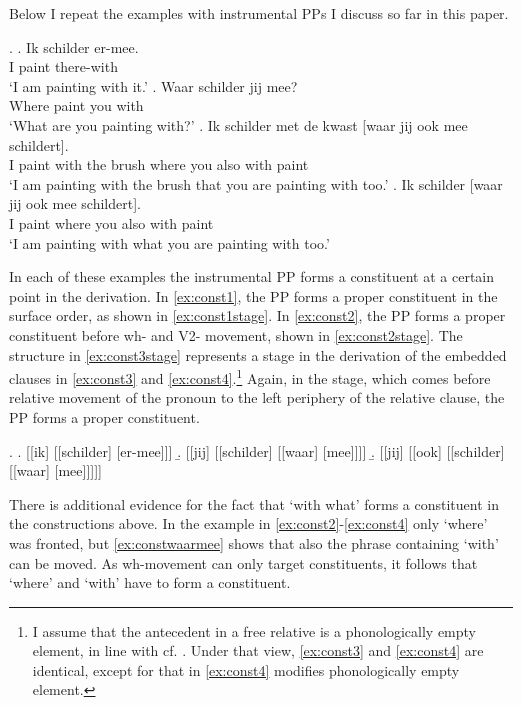 \documentclass{article}
\begin{document}
Below I repeat the examples with instrumental PPs I discuss so far in this paper.

\ex.
\ag. Ik schilder er-mee.\\
 I paint there-with\\
 `I am painting with it.'\label{ex:const1}
\bg. Waar schilder jij mee?\\
 Where paint you with\\
 `What are you painting with?'\label{ex:const2}
\bg. Ik schilder met de kwast [waar jij ook mee schildert].\\
 I paint with the brush where you also with paint\\
 `I am painting with the brush that you are painting with too.'\label{ex:const3}
\bg. Ik schilder [waar jij ook mee schildert].\\
 I paint where you also with paint\\
 `I am painting with what you are painting with too.'\label{ex:const4}

In each of these examples the instrumental PP forms a constituent at a certain point in the derivation. In \ref{ex:const1}, the PP forms a proper constituent in the surface order, as shown in \ref{ex:const1stage}. In \ref{ex:const2}, the PP forms a proper constituent before wh- and V2- movement, shown in \ref{ex:const2stage}.
The structure in \ref{ex:const3stage} represents a stage in the derivation of the embedded clauses in \ref{ex:const3} and \ref{ex:const4}.\footnote{I assume that the antecedent in a free relative is a phonologically empty element, in line with cf. \cite{bresnan1978a,groos1981,himmelreich2017}. Under that view, \ref{ex:const3} and \ref{ex:const4} are identical, except for that in \ref{ex:const4} modifies phonologically empty element.}
Again, in the stage, which comes before relative movement of the pronoun to the left periphery of the relative clause, the PP forms a proper constituent.

\ex.
\a. [[ik] [[schilder] [er-mee]]]\label{ex:const1stage}
\b. [[jij] [[schilder] [[waar] [mee]]]]\label{ex:const2stage}
\b. [[jij] [[ook] [[schilder] [[waar] [mee]]]]]\label{ex:const3stage}

There is additional evidence for the fact that  `with what' forms a constituent in the constructions above. In the example in \ref{ex:const2}-\ref{ex:const4} only  `where' was fronted, but \ref{ex:constwaarmee} shows that also the phrase containing  `with' can be moved. As wh-movement can only target constituents, it follows that  `where' and  `with' have to form a constituent.
\end{document}
